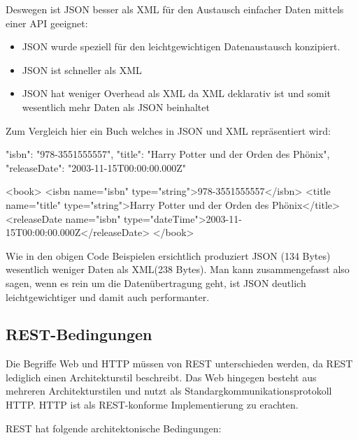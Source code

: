 \documentclass[bachelor, german ]{hgbthesis}
\begin{document}
Deswegen ist JSON besser als XML für den Austausch einfacher Daten mittels einer API geeignet:
\begin{itemize}
    \item JSON wurde speziell für den leichtgewichtigen Datenaustausch konzipiert.
    \item JSON ist schneller als XML
    \item JSON hat weniger Overhead als XML da XML deklarativ ist und somit wesentlich mehr Daten als JSON beinhaltet
\end{itemize}

Zum Vergleich hier ein Buch welches in JSON und XML repräsentiert wird:
\begin{JsCode}
{
    "isbn": "978-3551555557",
    "title": "Harry Potter und der Orden des Phönix",
    "releaseDate": "2003-11-15T00:00:00.000Z"
}
\end{JsCode}

\begin{XmlCode}
<book>
    <isbn name="isbn" type="string">978-3551555557</isbn>
    <title name="title" type="string">Harry Potter und der Orden des Phönix</title>
    <releaseDate name="isbn" type="dateTime">2003-11-15T00:00:00.000Z</releaseDate>
</book>
\end{XmlCode}

Wie in den obigen Code Beispielen ersichtlich produziert JSON (134 Bytes) wesentlich weniger Daten als XML(238 Bytes).
Man kann zusammengefasst also sagen, wenn es rein um die Datenübertragung geht, ist JSON deutlich leichtgewichtiger und damit auch performanter.

\subsection{REST-Bedingungen}
Die Begriffe Web und HTTP müssen von REST unterschieden werden, da REST lediglich einen Architekturstil beschreibt. Das Web hingegen besteht aus mehreren Architekturstilen und nutzt als Standargkommunikationsprotokoll HTTP. HTTP ist als
REST-konforme Implementierung zu erachten.
\newline


REST hat folgende architektonische Bedingungen:
\end{document}
